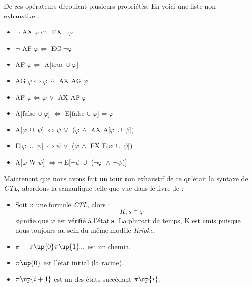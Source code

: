 \documentclass[runningheads,a4paper]{llncs}
\begin{document}
\noindent De ces opérateurs découlent plusieurs propriétés. En voici une liste non exhaustive : 
\begin{itemize}
\item $\lnot$ AX $\varphi \Leftrightarrow $ EX $\lnot \varphi$
\item $\lnot$ AF $\varphi \Leftrightarrow $ EG $\lnot \varphi$
\item AF $\varphi \Leftrightarrow $ A[true $\cup \ \varphi$]
\item AG $\varphi \Leftrightarrow \varphi \ \land$ AX AG $\varphi$
\item AF $\varphi \Leftrightarrow \varphi \ \lor$ AX AF $\varphi$
\item A[false $\cup \ \varphi$] $ \Leftrightarrow $ E[false $\cup \ \varphi$] = $\varphi$
\item A[$\varphi \ \cup \ \psi$] $ \Leftrightarrow \psi \ \lor$ ($\varphi \ \land$ AX A[$\varphi \ \cup \ \psi$])
\item E[$\varphi \ \cup \ \psi$] $ \Leftrightarrow \psi \ \lor$ ($\varphi \ \land$ EX E[$\varphi \ \cup \ \psi$])
\item A[$\varphi$ W $\psi$] $ \Leftrightarrow \lnot$ E[$\lnot \psi \ \cup$ ($\lnot \varphi \ \land \ \lnot \psi$)]\\
\end{itemize}

\noindent Maintenant que nous avons fait un tour non exhaustif de ce qu'était la syntaxe de \textit{CTL}, abordons la sémantique telle que vue dans le livre de \cite{principle} :  \\

\begin{itemize}
\item Soit $\varphi$ une formule \textit{CTL}, alors : $$K, s \vDash \varphi$$ signifie que $\varphi$ est vérifié à l'état \textbf{s}. La plupart du temps, K est omis puisque nous toujours au sein du même modèle \textit{Kripke}.\\
\item $\pi$ = $\pi\up{0} \pi\up{1} ...$ est un chemin.
\item $\pi\up{0}$ est l'état initial (la racine).
\item $\pi\up{i+1}$ est un des états succédant $\pi\up{i}$.\\
\end{itemize}
\end{document}
